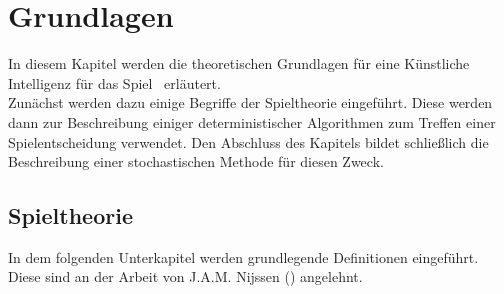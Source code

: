 \chapter{Grundlagen}
\authorpatrick
\label{basics}
In diesem Kapitel werden die theoretischen Grundlagen für eine Künstliche Intelligenz für das Spiel \ot\ erläutert.\\
Zunächst werden dazu einige Begriffe der Spieltheorie eingeführt. Diese werden dann zur Beschreibung einiger deterministischer Algorithmen zum Treffen einer Spielentscheidung verwendet. Den Abschluss des Kapitels bildet schließlich die Beschreibung einer stochastischen Methode für diesen Zweck. 
\section{Spieltheorie}
In dem folgenden Unterkapitel werden grundlegende Definitionen eingeführt. Diese sind an der Arbeit  von J.A.M. Nijssen (\cite{Russell.2016}) angelehnt.
